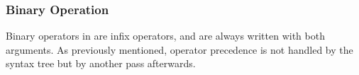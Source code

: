 \subsubsection{Binary Operation}
\label{sec:binop}

Binary operators in \Poetry{} are infix operators, and are always written
with both arguments. As previously mentioned, operator precedence is not
handled by the syntax tree but by another pass afterwards.

\begin{bnf*}
     \\
     \\
    \bnfmore{
        \bnfts{\op{==}}
        \bnfor
        \bnfts{\op{===}}
        \bnfor
        \bnfts{\op{<}}
        \bnfor
        \bnfts{\op{>}}
        \bnfor
        \bnfts{\op{>=}}
        \bnfor
        \bnfts{\op{<=}}
        \bnfor
    } \\
     \\
    \bnfmore{
        \bnfts{\op{<>}}
        \bnfor
        \bnfts{\op{>>}}
        \bnfor
        \bnfts{\op{<<}}
        \bnfor
        \bnfts{\op{|>}}
        \bnfor
        \bnfts{\op{<|}}
    } \\
\end{bnf*}
